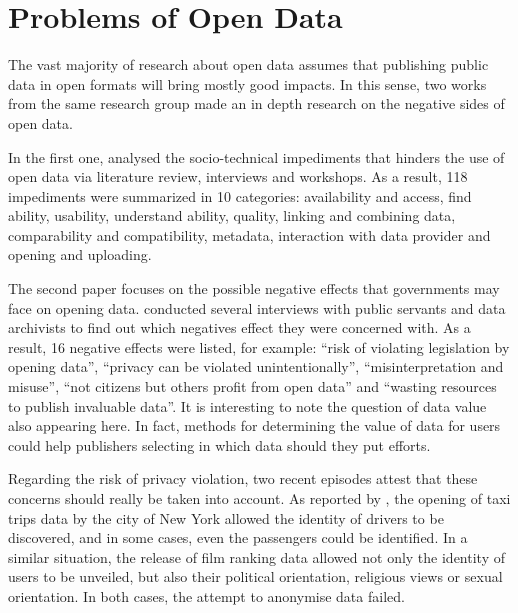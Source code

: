 


\section{Problems of Open Data}
\label{sec:problems}

The vast majority of research about open data assumes that publishing public data in open formats will bring mostly good impacts.
In this sense, two works from the same research group made an in depth research on the negative sides of open data.

In the first one,  analysed the socio-technical impediments that hinders the use of open data via literature review, interviews and workshops.
As a result, 118 impediments were summarized in 10 categories: availability and access, find ability, usability, understand ability, quality, linking and combining data, comparability and compatibility, metadata, interaction with data provider and opening and uploading.

The second paper focuses on the possible negative effects that governments may face on opening data.  conducted several interviews with public servants and data archivists to find out which negatives effect they were concerned with.
As a result, 16 negative effects were listed, for example: ``risk of violating legislation by opening data'', ``privacy can be violated unintentionally'', ``misinterpretation and misuse'', ``not citizens but others profit from open data'' and ``wasting resources to publish invaluable data''.
It is interesting to note the question of data value also appearing here.
In fact, methods for determining the value of data for users could help publishers selecting in which data should they put efforts.

Regarding the risk of privacy violation, two recent episodes attest that these concerns should really be taken into account.
As reported by , the opening of taxi trips data by the city of New York allowed the identity of drivers to be discovered, and in some cases, even the passengers could be identified.
In a similar situation, the release of film ranking data allowed not only the identity of users to be unveiled, but also their political orientation, religious views or sexual orientation.
In both cases, the attempt to anonymise data failed.

